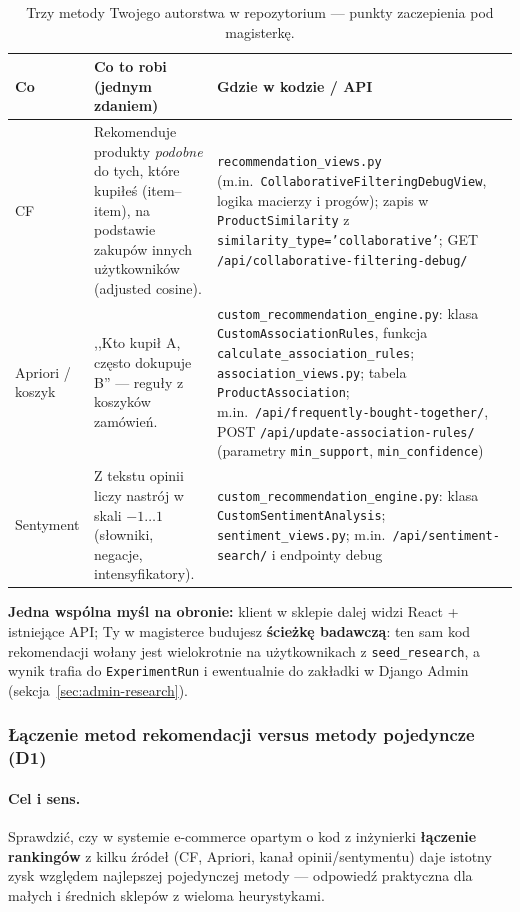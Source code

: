 \documentclass[a4paper,11pt]{article}
\newcommand{\code}[1]{\texttt{\small #1}}
\begin{document}
\begin{table}[H]
\centering
\footnotesize
\begin{tabularx}{\textwidth}{l Y l}
\toprule
\textbf{Co} & \textbf{Co to robi (jednym zdaniem)} & \textbf{Gdzie w kodzie / API} \\
\midrule
CF & Rekomenduje produkty \emph{podobne} do tych, które kupiłeś (item--item), na podstawie zakupów innych użytkowników (adjusted cosine). & \code{recommendation\_views.py} (m.in.\ \code{CollaborativeFilteringDebugView}, logika macierzy i progów); zapis w \code{ProductSimilarity} z \code{similarity\_type='collaborative'}; GET \code{/api/collaborative-filtering-debug/} \\
Apriori / koszyk & ,,Kto kupił A, często dokupuje B'' --- reguły z koszyków zamówień. & \code{custom\_recommendation\_engine.py}: klasa \code{CustomAssociationRules}, funkcja \code{calculate\_association\_rules}; \code{association\_views.py}; tabela \code{ProductAssociation}; m.in.\ \code{/api/frequently-bought-together/}, POST \code{/api/update-association-rules/} (parametry \code{min\_support}, \code{min\_confidence}) \\
Sentyment & Z tekstu opinii liczy nastrój w skali $-1\ldots 1$ (słowniki, negacje, intensyfikatory). & \code{custom\_recommendation\_engine.py}: klasa \code{CustomSentimentAnalysis}; \code{sentiment\_views.py}; m.in.\ \code{/api/sentiment-search/} i endpointy debug \\
\bottomrule
\end{tabularx}
\caption{Trzy metody Twojego autorstwa w repozytorium --- punkty zaczepienia pod magisterkę.}
\end{table}

\noindent\textbf{Jedna wspólna myśl na obronie:} klient w sklepie dalej widzi React + istniejące API; Ty w magisterce budujesz \textbf{ścieżkę badawczą}: ten sam kod rekomendacji wołany jest wielokrotnie na użytkownikach z \texttt{seed\_research}, a wynik trafia do \code{ExperimentRun} i ewentualnie do zakładki w Django Admin (sekcja~\ref{sec:admin-research}).

\subsubsection{Łączenie metod rekomendacji versus metody pojedyncze (\textbf{D1})}

\paragraph{Cel i sens.}
Sprawdzić, czy w systemie e-commerce opartym o kod z inżynierki \textbf{łączenie rankingów} z kilku źródeł (CF, Apriori, kanał opinii/sentymentu) daje istotny zysk względem najlepszej pojedynczej metody --- odpowiedź praktyczna dla małych i średnich sklepów z wieloma heurystykami.
\end{document}
